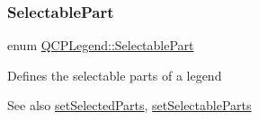 \subsubsection{\texorpdfstring{Selectable\+Part}{SelectablePart}\hspace{0.1cm}{\footnotesize\ttfamily [1/2]}}
{\footnotesize\ttfamily enum \hyperlink{class_q_c_p_legend_a5404de8bc1e4a994ca4ae69e2c7072f1}{Q\+C\+P\+Legend\+::\+Selectable\+Part}}

Defines the selectable parts of a legend

\begin{DoxySeeAlso}{See also}
\hyperlink{class_q_c_p_legend_a2aee309bb5c2a794b1987f3fc97f8ad8}{set\+Selected\+Parts}, \hyperlink{class_q_c_p_legend_a9ce60aa8bbd89f62ae4fa83ac6c60110}{set\+Selectable\+Parts} 
\end{DoxySeeAlso}

